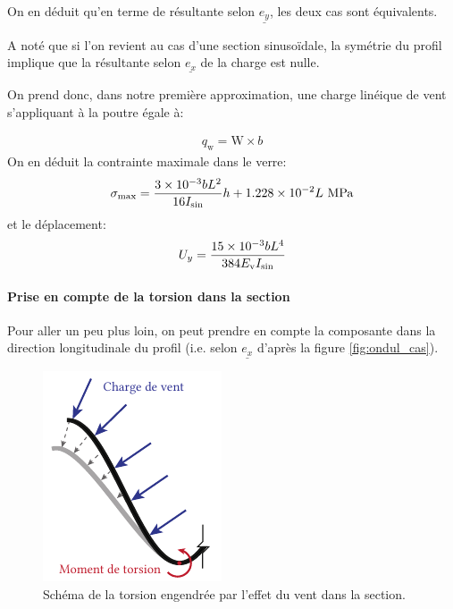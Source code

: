 \documentclass[11pt,titlepage]{article}
\begin{document}
On en déduit qu'en terme de résultante selon $\underline{e_y}$, les deux cas sont équivalents.

A noté que si l'on revient au cas d'une section sinusoïdale, la symétrie du profil implique que la résultante selon $\underline{e_x}$ de la charge est nulle. 

On prend donc, dans notre première approximation, une charge linéique de vent s'appliquant à la poutre égale à:

\begin{align}
    q_{\text{w}} = \text{W} \times b
\end{align}
On en déduit la contrainte maximale dans le verre: 
\begin{align}
    \sigma_{\text{max}} = \frac{\num{3d-3} b L^2}{16 I_{\text{sin}}}h + \num{1.228d-2} L\text{ }\unit{\mega\pascal}
\end{align}
et le déplacement:
\begin{align}
    U_y = \frac{\num{15d-3} b L^4}{384 E_{\text{v}}I_{\text{sin}}}
\end{align}

\paragraph{Prise en compte de la torsion dans la section}\mbox{}

Pour aller un peu plus loin, on peut prendre en compte la composante dans la direction longitudinale du profil (i.e. selon $\underline{e_x}$ d'après la figure \ref{fig:ondul_cas}). 

\begin{figure}
\centering
\includegraphics[width=0.8\linewidth]{img/ondul/torsion.pdf}
\caption{Schéma de la torsion engendrée par l'effet du vent dans la section.}
\label{fig:tors_ondul}
\vspace{10pt}
\end{figure}
\end{document}
